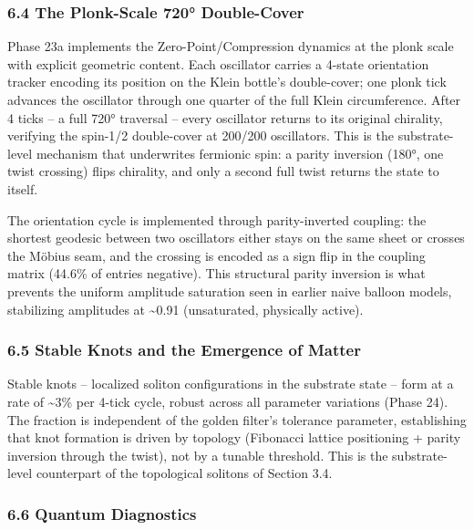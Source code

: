 \documentclass[
]{article}
\begin{document}
\subsubsection{6.4 The Plonk-Scale 720°
Double-Cover}\label{the-plonk-scale-720-double-cover}

Phase 23a implements the Zero-Point/Compression dynamics at the plonk
scale with explicit geometric content. Each oscillator carries a 4-state
orientation tracker encoding its position on the Klein bottle's
double-cover; one plonk tick advances the oscillator through one quarter
of the full Klein circumference. After 4 ticks -- a full 720° traversal
-- every oscillator returns to its original chirality, verifying the
spin-1/2 double-cover at 200/200 oscillators. This is the
substrate-level mechanism that underwrites fermionic spin: a parity
inversion (180°, one twist crossing) flips chirality, and only a second
full twist returns the state to itself.

The orientation cycle is implemented through parity-inverted coupling:
the shortest geodesic between two oscillators either stays on the same
sheet or crosses the Möbius seam, and the crossing is encoded as a sign
flip in the coupling matrix (44.6\% of entries negative). This
structural parity inversion is what prevents the uniform amplitude
saturation seen in earlier naive balloon models, stabilizing amplitudes
at \textasciitilde0.91 (unsaturated, physically active).

\subsubsection{6.5 Stable Knots and the Emergence of
Matter}\label{stable-knots-and-the-emergence-of-matter}

Stable knots -- localized soliton configurations in the substrate state
-- form at a rate of \textasciitilde3\% per 4-tick cycle, robust across
all parameter variations (Phase 24). The fraction is independent of the
golden filter's tolerance parameter, establishing that knot formation is
driven by topology (Fibonacci lattice positioning + parity inversion
through the twist), not by a tunable threshold. This is the
substrate-level counterpart of the topological solitons of Section 3.4.

\subsubsection{6.6 Quantum Diagnostics}\label{quantum-diagnostics}
\end{document}
